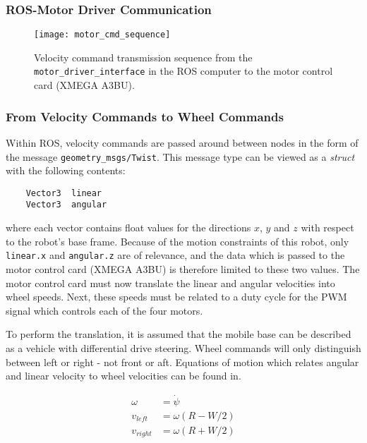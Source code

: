 \subsubsection{ROS-Motor Driver Communication}

\begin{figure}[h]
	\centering
	\texttt{[image: motor\_cmd\_sequence]}
	\caption{Velocity command transmission sequence from the \texttt{motor\_driver\_interface} in the ROS computer to the motor control card (XMEGA A3BU).}
	\label{fig:motor_cmd_sequence}
\end{figure}


\subsubsection{From Velocity Commands to Wheel Commands}

Within \ac{ROS}, velocity commands are passed around between nodes in the form of the message \texttt{geometry\_msgs/Twist}. This message type can be viewed as a \textit{struct} with the following contents:

\begin{verbatim}
	Vector3  linear
	Vector3  angular
\end{verbatim}

where each vector contains float values for the directions $x$, $y$ and $z$ with respect to the robot's base frame. Because of the motion constraints of this robot, only \texttt{linear.x} and \texttt{angular.z} are of relevance, and the data which is passed to the motor control card (XMEGA A3BU) is therefore limited to these two values. The motor control card must now translate the linear and angular velocities into wheel speeds. Next, these speeds must be related to a duty cycle for the \ac{PWM} signal which controls each of the four motors.

To perform the translation, it is assumed that the mobile base can be described as a vehicle with differential drive steering. Wheel commands will only distinguish between left or right - not front or aft. Equations of motion which relates angular and linear velocity to wheel velocities can be found in\cite{cook2011mobile}. 

\begin{subequations}\label{eq:subeqns}
  	\begin{align}
	  	\omega &= \dot{\psi} \\
	   	v_{left} &= \omega (R - W/2)\\
	   	v_{right} &= \omega (R + W/2) \label{eq:subeq2}
   	\end{align}
\end{subequations}

